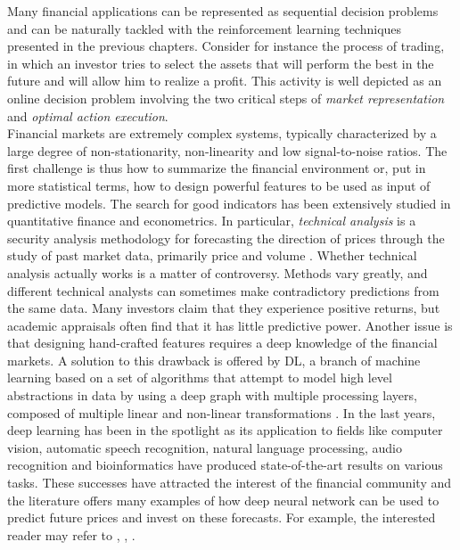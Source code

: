 Many financial applications can be represented as sequential decision problems and can be naturally tackled with the reinforcement learning techniques presented in the previous chapters. Consider for instance the process of trading, in which an investor tries to select the assets that will perform the best in the future and will allow him to realize a profit. This activity is well depicted as an online decision problem involving the two critical steps of \emph{market representation} and \emph{optimal action execution}.\\
Financial markets are extremely complex systems, typically characterized by a large degree of non-stationarity, non-linearity and low signal-to-noise ratios. The first challenge is thus how to summarize the financial environment or, put in more statistical terms, how to design powerful features to be used as input of predictive models. The search for good indicators has been extensively studied in quantitative finance and econometrics. In particular, \emph{technical analysis} is a security analysis methodology for forecasting the direction of prices through the study of past market data, primarily price and volume \cite{lo2000foundations}. Whether technical analysis actually works is a matter of controversy. Methods vary greatly, and different technical analysts can sometimes make contradictory predictions from the same data. Many investors claim that they experience positive returns, but academic appraisals often find that it has little predictive power. Another issue is that designing hand-crafted features requires a deep knowledge of the financial markets. A solution to this drawback is offered by \gls{DL}, a branch of machine learning based on a set of algorithms that attempt to model high level abstractions in data by using a deep graph with multiple processing layers, composed of multiple linear and non-linear transformations \cite{Goodfellow-et-al-2016-Book}. In the last years, deep learning has been in the spotlight as its application to fields like computer vision, automatic speech recognition, natural language processing, audio recognition and bioinformatics have produced state-of-the-art results on various tasks. These successes have attracted the interest of the financial community and the literature offers many examples of how deep neural network can be used to predict future prices and invest on these forecasts. For example, the interested reader may refer to \cite{kamijo1990stock}, \cite{saad1998comparative}, \cite{liang2011stock}.\\ 

